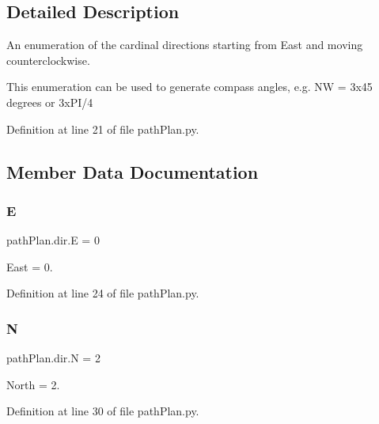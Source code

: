 \subsection{Detailed Description}
An enumeration of the cardinal directions starting from East and moving counterclockwise. 

This enumeration can be used to generate compass angles, e.\+g. NW = 3x45 degrees or 3x\+P\+I/4 

Definition at line 21 of file path\+Plan.\+py.



\subsection{Member Data Documentation}
\mbox{\label{classpath_plan_1_1dir_ace7274c1b8112b1e26f8ad53e611cb55}} 
\subsubsection{\texorpdfstring{E}{E}}
{\footnotesize\ttfamily path\+Plan.\+dir.\+E = 0\hspace{0.3cm}{\ttfamily [static]}}



East = 0. 



Definition at line 24 of file path\+Plan.\+py.

\mbox{\label{classpath_plan_1_1dir_a86f4448228a961438a153a2420fec66b}} 
\subsubsection{\texorpdfstring{N}{N}}
{\footnotesize\ttfamily path\+Plan.\+dir.\+N = 2\hspace{0.3cm}{\ttfamily [static]}}



North = 2. 



Definition at line 30 of file path\+Plan.\+py.

\mbox{\label{classpath_plan_1_1dir_a577daab51fe30a40ad5cff407197018d}} 
